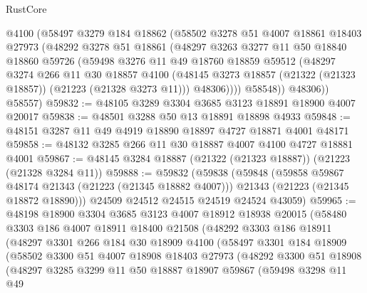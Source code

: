 \begin{lexlean}{RustCore}
\begin{coremodule}
          @4100
          (@58497
            @3279
            @184
            @18862
            (@58502
              @3278
              @51
              @4007
              @18861
              @18403
              @27973
              (@48292
                @3278
                @51
                @18861
                (@48297
                  @3263
                  @3277
                  @11
                  @50
                  @18840
                  @18860
                  @59726
                  (@59498
                    @3276
                    @11
                    @49
                    @18760
                    @18859
                    @59512
                    (@48297
                      @3274
                      @266
                      @11
                      @30
                      @18857
                      @4100
                      (@48145 @3273 @18857 (@21322 (@21323 @18857)) (@21223 (@21328 @3273 @11)))
                      @48306))))
              @58548))
          @48306))
      @58557)
@59832 := @48105 @3289 @3304 @3685 @3123 @18891 @18900 @4007 @20017
@59838 := @48501 @3288 @50 @13 @18891 @18898 @4933
@59848 := @48151 @3287 @11 @49 @4919 @18890 @18897 @4727 @18871 @4001 @48171
@59858 := @48132 @3285 @266 @11 @30 @18887 @4007 @4100 @4727 @18881 @4001
@59867 := @48145 @3284 @18887 (@21322 (@21323 @18887)) (@21223 (@21328 @3284 @11))
@59888 := @59832
    (@59838
      (@59848
        (@59858 @59867 @48174 @21343 (@21223 (@21345 @18882 @4007)))
        @21343
        (@21223 (@21345 @18872 @18890)))
      @24509
      @24512
      @24515
      @24519
      @24524
      @43059)
@59965 := @48198
    @18900
    @3304
    @3685
    @3123
    @4007
    @18912
    @18938
    @20015
    (@58480
      @3303
      @186
      @4007
      @18911
      @18400
      @21508
      (@48292
        @3303
        @186
        @18911
        (@48297
          @3301
          @266
          @184
          @30
          @18909
          @4100
          (@58497
            @3301
            @184
            @18909
            (@58502
              @3300
              @51
              @4007
              @18908
              @18403
              @27973
              (@48292
                @3300
                @51
                @18908
                (@48297
                  @3285
                  @3299
                  @11
                  @50
                  @18887
                  @18907
                  @59867
                  (@59498
                    @3298
                    @11
                    @49

\end{coremodule}
\end{lexlean}
